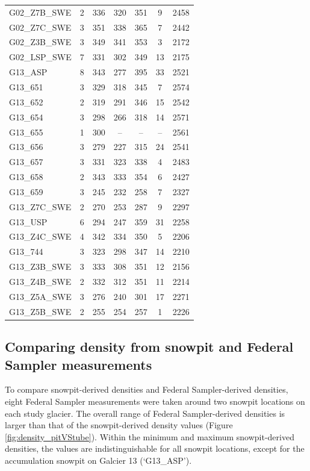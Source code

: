 \documentclass{sfuthesis}
\begin{document}
\begin{table}[]
\begin{tabular}{lcccccc}
G02\_Z7B\_SWE & 2 & 336 & 320 & 351 & 9 & 2458 \\
G02\_Z7C\_SWE & 3 & 351 & 338 & 365 & 7 & 2442 \\
G02\_Z3B\_SWE & 3 & 349 & 341 & 353 & 3  & 2172\\
G02\_LSP\_SWE & 7 & 331 & 302 & 349 & 13 & 2175 \\ \hline
G13\_ASP & 8 & 343 & 277 & 395 & 33  & 2521\\
G13\_651 & 3 & 329 & 318 & 345 & 7  & 2574\\
G13\_652 & 2 & 319 & 291 & 346 & 15  & 2542\\
G13\_654 & 3 & 298 & 266 & 318 & 14  & 2571\\
G13\_655 & 1 & 300 &-- & -- & --  & 2561\\
G13\_656 & 3 & 279 & 227 & 315 & 24  & 2541\\
G13\_657 & 3 & 331 & 323 & 338 & 4  & 2483\\
G13\_658 & 2 & 343 & 333 & 354 & 6  & 2427\\
G13\_659 & 3 & 245 & 232 & 258 & 7 & 2327 \\
G13\_Z7C\_SWE & 2 & 270 & 253 & 287 & 9  & 2297\\
G13\_USP & 6 & 294 & 247 & 359 & 31  & 2258\\
G13\_Z4C\_SWE & 4 & 342 & 334 & 350 & 5 & 2206 \\
G13\_744 & 3 & 323 & 298 & 347 & 14 & 2210 \\
G13\_Z3B\_SWE & 3 & 333 & 308 & 351 & 12 & 2156 \\
G13\_Z4B\_SWE & 2 & 332 & 312 & 351 & 11  & 2214\\
G13\_Z5A\_SWE & 3 & 276 & 240 & 301 & 17  & 2271\\
G13\_Z5B\_SWE & 2 & 255 & 254 & 257 & 1 & 2226
\end{tabular}
\end{table}

\subsection{Comparing density from snowpit and Federal Sampler measurements}

To compare snowpit-derived densities and Federal Sampler-derived densities, eight Federal Sampler measurements were taken around two snowpit locations on each study glacier.  The overall range of Federal Sampler-derived densities is larger than that of the snowpit-derived density values (Figure \ref{fig:density_pitVStube}). Within the minimum and maximum snowpit-derived densities, the values are indistinguishable for all snowpit locations, except for the accumulation snowpit on Galcier 13 (`G13\_ASP').
\end{document}
